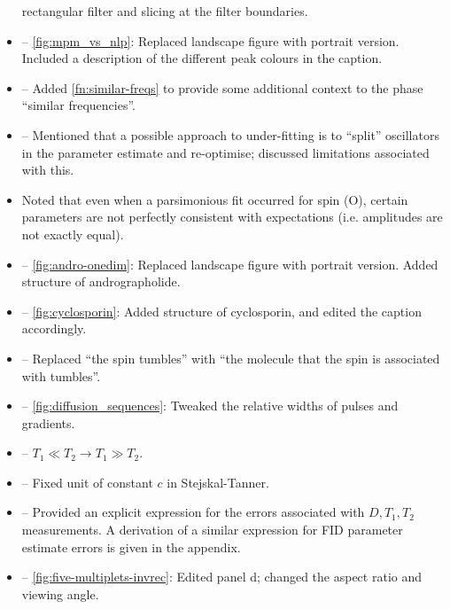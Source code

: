 \documentclass[12pt]{article}
\begin{document}
\begin{itemize}
            rectangular filter and slicing at the filter boundaries.
        \item {} -- \cref{fig:mpm_vs_nlp}: Replaced
            landscape figure with portrait version. Included a description of the
            different peak colours in the caption.
        \item {} -- Added \cref{fn:similar-freqs} to
            provide some additional context to the phase ``similar frequencies''.
        \item {} -- Mentioned that a possible approach
            to under-fitting is to ``split'' oscillators in the parameter
            estimate and re-optimise; discussed limitations associated with
            this.
        \item {} Noted that even when a parsimonious fit
            occurred for spin (O), certain parameters are not perfectly consistent
            with expectations (i.e. amplitudes are not exactly equal).
        \item {} -- \cref{fig:andro-onedim}: Replaced
            landscape figure with portrait version. Added structure of andrographolide.
        \item {} -- \cref{fig:cyclosporin}: Added structure of
            cyclosporin, and edited the caption accordingly.
        \item {} -- Replaced ``the spin tumbles''
            with ``the molecule that the spin is associated with tumbles''.
        \item {} -- \cref{fig:diffusion_sequences}:
            Tweaked the relative widths of pulses and gradients.
       \item {} -- $T_1 \ll T_2 \rightarrow T_1 \gg T_2$.
        \item {} -- Fixed unit of constant $c$ in
            Stejskal-Tanner.
        \item {} -- Provided an explicit expression for
            the errors associated with $D, T_1, T_2$ measurements.
            A derivation of a similar expression for FID parameter estimate
            errors is given in the appendix.
        \item {} -- \cref{fig:five-multiplets-invrec}:
            Edited panel d; changed the aspect ratio and viewing angle.

\end{itemize}
\end{document}
